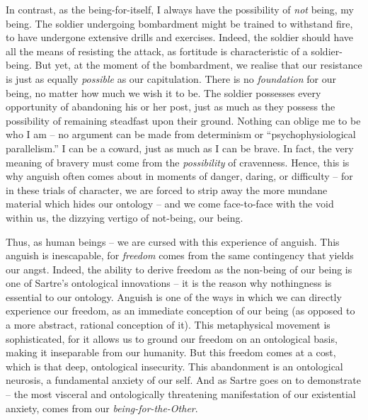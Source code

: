In contrast, as the being-for-itself, I always have the possibility of \emph{not} being, my being. The soldier undergoing bombardment might be trained to withstand fire, to have undergone extensive drills and exercises. Indeed, the soldier should have all the means of resisting the attack, as fortitude is characteristic of a soldier-being. But yet, at the moment of the bombardment, we realise that our resistance is just as equally \emph{possible} as our capitulation. There is no \emph{foundation} for our being, no matter how much we wish it to be. The soldier possesses every opportunity of abandoning his or her post, just as much as they possess the possibility of remaining steadfast upon their ground.  Nothing can oblige me to be who I am -- no argument can be made from determinism or \enquote{psychophysiological parallelism.} I can be a coward, just as much as I can be brave. In fact, the very meaning of bravery must come from the \emph{possibility} of cravenness. Hence, this is why anguish often comes about in moments of danger, daring, or difficulty -- for in these trials of character, we are forced to strip away the more mundane material which hides our ontology -- and we come face-to-face with the void within us, the dizzying vertigo of not-being, our being.

Thus, as human beings -- we are cursed with this experience of anguish. This anguish is inescapable, for \emph{freedom} comes from the same contingency that yields our angst. Indeed, the ability to derive freedom as the non-being of our being is one of Sartre's ontological innovations -- it is the reason why nothingness is essential to our ontology. Anguish is one of the ways in which we can directly experience our freedom, as an immediate conception of our being (as opposed to a more abstract, rational conception of it).  This metaphysical movement is sophisticated, for it allows us to ground our freedom on an ontological basis, making it inseparable from our humanity.  But this freedom comes at a cost, which is that deep, ontological insecurity.  This abandonment is an ontological neurosis, a fundamental anxiety of our self. And as Sartre goes on to demonstrate -- the most visceral and ontologically threatening manifestation of our existential anxiety, comes from our \emph{being-for-the-Other}.


